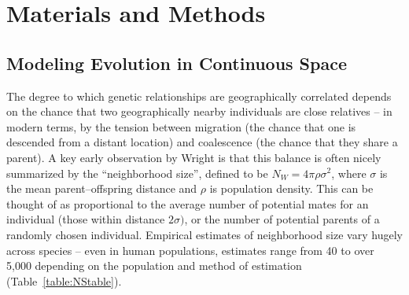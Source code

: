 \documentclass[10pt,twoside,lineno,hidelinks]{preprint}
\begin{document}
\section{Materials and Methods}
\label{sec:materials:methods}

\subsection{Modeling Evolution in Continuous Space}

The degree to which genetic relationships are geographically correlated
depends on the chance that two geographically nearby individuals are close relatives
-- in modern terms, by the tension between
migration (the chance that one is descended from a distant location)
and coalescence (the chance that they share a parent).
A key early observation by Wright \citep{Wright1946} is that this balance is often nicely summarized by the ``neighborhood size'',
defined to be $N_W = 4 \pi \rho \sigma^2$, where $\sigma$ is the mean parent--offspring distance and $\rho$ is population density. 
This can be thought of as proportional to the average number of potential mates for an individual (those within distance $2 \sigma)$,
or the number of potential parents of a randomly chosen individual. Empirical estimates of neighborhood size vary hugely across species
-- even in human populations,
estimates range from 40 to over 5,000 depending on the population and method of estimation (Table~\ref{table:NStable}).
\end{document}
